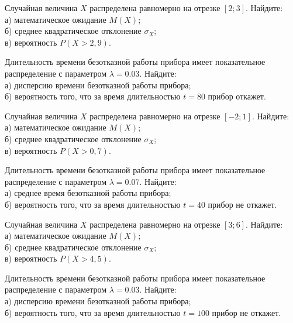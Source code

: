 \vfill

\newpage\setcounter{zad}{0}

\z Случайная величина $X$ распределена равномерно на отрезке $[2; 3]$. Найдите: \\ \quad а) математическое ожидание $M(X)$; \\ \quad б) среднее квадратическое отклонение $\sigma_X$; \\ \quad в) вероятность $P(X>2{,}9)$.


\vfill

\z Длительность времени безотказной работы прибора имеет показательное распределение с параметром $\lambda = 0.03$. Найдите: \\ \quad а) дисперсию времени безотказной работы прибора; \\ \quad б) вероятность того, что за время длительностью $t = 80$ прибор откажет.
 

\vfill

\newpage\setcounter{zad}{0}

\z Случайная величина $X$ распределена равномерно на отрезке $[-2; 1]$. Найдите: \\ \quad а) математическое ожидание $M(X)$; \\ \quad б) среднее квадратическое отклонение $\sigma_X$; \\ \quad в) вероятность $P(X>0{,}7)$.


\vfill

\z Длительность времени безотказной работы прибора имеет показательное распределение с параметром $\lambda = 0.07$. Найдите: \\ \quad а) среднее время безотказной работы прибора; \\ \quad б) вероятность того, что за время длительностью $t = 40$ прибор не откажет.
 

\vfill

\newpage\setcounter{zad}{0}

\z Случайная величина $X$ распределена равномерно на отрезке $[3; 6]$. Найдите: \\ \quad а) математическое ожидание $M(X)$; \\ \quad б) среднее квадратическое отклонение $\sigma_X$; \\ \quad в) вероятность $P(X>4{,}5)$.


\vfill

\z Длительность времени безотказной работы прибора имеет показательное распределение с параметром $\lambda = 0.03$. Найдите: \\ \quad а) дисперсию времени безотказной работы прибора; \\ \quad б) вероятность того, что за время длительностью $t = 100$ прибор не откажет.
 

\vfill

\newpage\setcounter{zad}{0}